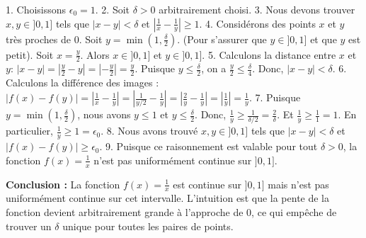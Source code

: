 \documentclass[12pt,a4paper]{report}
\begin{document}
1.  Choisissons $\epsilon_0 = 1$.
2.  Soit $\delta > 0$ arbitrairement choisi.
3.  Nous devons trouver $x, y \in ]0, 1]$ tels que $|x - y| < \delta$ et $\left|\frac{1}{x} - \frac{1}{y}\right| \ge 1$.
4.  Considérons des points $x$ et $y$ très proches de $0$.
    Soit $y = \min\left(1, \frac{\delta}{2}\right)$. (Pour s'assurer que $y \in ]0, 1]$ et que $y$ est petit).
    Soit $x = \frac{y}{2}$.
    Alors $x \in ]0, 1]$ et $y \in ]0, 1]$.
5.  Calculons la distance entre $x$ et $y$:
    $|x - y| = \left|\frac{y}{2} - y\right| = \left|-\frac{y}{2}\right| = \frac{y}{2}$.
    Puisque $y \le \frac{\delta}{2}$, on a $\frac{y}{2} \le \frac{\delta}{4}$.
    Donc, $|x - y| < \delta$.
6.  Calculons la différence des images :
    $|f(x) - f(y)| = \left|\frac{1}{x} - \frac{1}{y}\right| = \left|\frac{1}{y/2} - \frac{1}{y}\right| = \left|\frac{2}{y} - \frac{1}{y}\right| = \left|\frac{1}{y}\right| = \frac{1}{y}$.
7.  Puisque $y = \min\left(1, \frac{\delta}{2}\right)$, nous avons $y \le 1$ et $y \le \frac{\delta}{2}$.
    Donc, $\frac{1}{y} \ge \frac{1}{\delta/2} = \frac{2}{\delta}$.
    Et $\frac{1}{y} \ge \frac{1}{1} = 1$.
    En particulier, $\frac{1}{y} \ge 1 = \epsilon_0$.
8.  Nous avons trouvé $x, y \in ]0, 1]$ tels que $|x - y| < \delta$ et $|f(x) - f(y)| \ge \epsilon_0$.
9.  Puisque ce raisonnement est valable pour tout $\delta > 0$, la fonction $f(x) = \frac{1}{x}$ n'est pas uniformément continue sur $]0, 1]$.

\textbf{Conclusion :} La fonction $f(x) = \frac{1}{x}$ est continue sur $]0, 1]$ mais n'est pas uniformément continue sur cet intervalle. L'intuition est que la pente de la fonction devient arbitrairement grande à l'approche de 0, ce qui empêche de trouver un $\delta$ unique pour toutes les paires de points.
\end{document}
